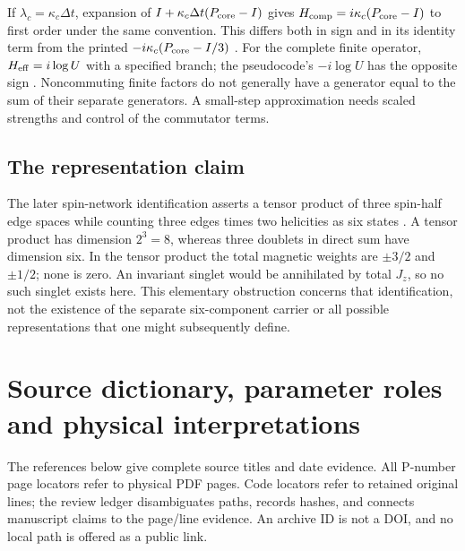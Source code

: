 \documentclass[11pt,a4paper]{article}
\theoremstyle{definition}
\numberwithin{equation}{section}
\begin{document}
If $\lambda_c=\kappa_c\Delta t$, expansion of
$I+\kappa_c\Delta t(P_{\rm core}-I)$ gives
$H_{\rm comp}=i\kappa_c(P_{\rm core}-I)$ to first order under
the same convention. This differs both in sign and in its identity term
from the printed $-i\kappa_c(P_{\rm core}-I/3)$
\cite[physical pp.~7,31]{P15}.
For the complete finite operator, $H_{\rm eff}=i\log U$ with a
specified branch; the pseudocode's $-i\log U$ has the opposite sign
\cite[physical p.~34, Appendix H.6]{P15}.
Noncommuting finite factors do not generally have a generator equal to
the sum of their separate generators. A small-step approximation needs
scaled strengths and control of the commutator terms.

\subsection{The representation claim}

The later spin-network identification asserts a tensor product of three
spin-half edge spaces while counting three edges times two helicities as
six states \cite[physical p.~49, Appendix O]{P15}.
A tensor product has dimension $2^3=8$, whereas three doublets in direct
sum have dimension six. In the tensor product the total magnetic weights
are $\pm3/2$ and $\pm1/2$; none is zero. An invariant singlet would be
annihilated by total $J_z$, so no such singlet exists here.
This elementary obstruction concerns that identification, not the
existence of the separate six-component carrier or all possible
representations that one might subsequently define.

\section{Source dictionary, parameter roles and physical interpretations}
\label{app:sources}

The references below give complete source titles and date evidence.
All P-number page locators refer to physical PDF pages. Code locators
refer to retained original lines; the review ledger disambiguates paths,
records hashes, and connects manuscript claims to the page/line evidence.
An archive ID is not a DOI, and no local path is offered as a public link.
\end{document}
